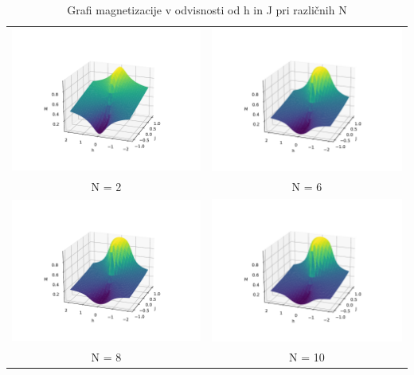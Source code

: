 \documentclass{article}
\begin{document}
\begin{itemize}
    \begin{table}[H]
    \hskip-1.2cm\begin{tabular}{c c}
        \includegraphics[trim=100 0 100 0,clip,width = .5 \textwidth]{TFIM_3D_N=2.pdf} &  \includegraphics[trim=100 0 100 0,clip,width = .5 \textwidth]{TFIM_3D_N=6.pdf}\\
        N = 2& N = 6\\
        \includegraphics[trim=100 0 100 0,clip,width = .5 \textwidth]{TFIM_3D_N=8.pdf} &  \includegraphics[trim=100 0 100 0,clip,width = .5 \textwidth]{TFIM_3D_N=10.pdf}\\
         N = 8 & N = 10 
    \end{tabular}
    \caption*{Grafi magnetizacije v odvisnosti od h in J pri različnih N}
    \end{table}
\end{itemize}
\end{document}
